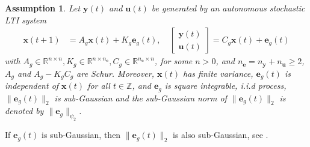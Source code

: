 \documentclass{article}
\def\rve{{\mathbf{e}}}
\def\rvu{{\mathbf{i}}}
\def\rvu{{\mathbf{u}}}
\def\rvx{{\mathbf{x}}}
\def\rvy{{\mathbf{y}}}
\newtheorem{assumption}[theorem]{Assumption}
\newcommand{\e}{\mathbf{e}}
\newcommand{\y}{\mathbf{y}}
\newcommand{\bP}{\mathbf{P}}
\newcommand{\bE}{\mathbf{E}}
\begin{document}
\begin{assumption}\label{as:generator}
	Let $\y(t)$ and $\mathbf{u}(t)$ be generated by an autonomous stochastic LTI system
    \begin{align}\label{eq:generator}
			\rvx(t+1) &=A_g\rvx(t)+K_g\rve_g(t), \quad
			\begin{bmatrix}\rvy(t)\\\rvu(t)\end{bmatrix}=C_g\rvx(t)+\rve_g(t)
		\end{align}
	with $A_g \in \mathbb{R}^{n \times n},K_g \in \mathbb{R}^{n \times n_\rve},C_g \in \mathbb{R}^{n_\rve \times n}$, for some $n>0$, and $n_\rve=n_\rvy+n_\rvu\geq2$, $A_g$ and $A_g-K_gC_g$ are Schur. Moreover, 
		$\rvx(t)$ has finite variance, $\rve_g(t)$ is independent of $\rvx(t)$ for all $t \in \mathbb{Z}$, 
		and $\rve_g$ is square integrable, i.i.d process,
    $\|\rve_g(t)\|_2$ is sub-Gaussian and the sub-Gaussian norm of $\|\rve_g(t)\|_2$
    \cite[Definition 2.6.4]{vershynin2026highdimensional} is denoted by $\|\rve_g\|_{\psi_2}$.
\end{assumption}
If $\e_g(t)$ is sub-Gaussian, then $\|\e_g(t)\|_2$ is also sub-Gaussian, see
\cite[Lemma 1]{jin2019short}.
\end{document}
